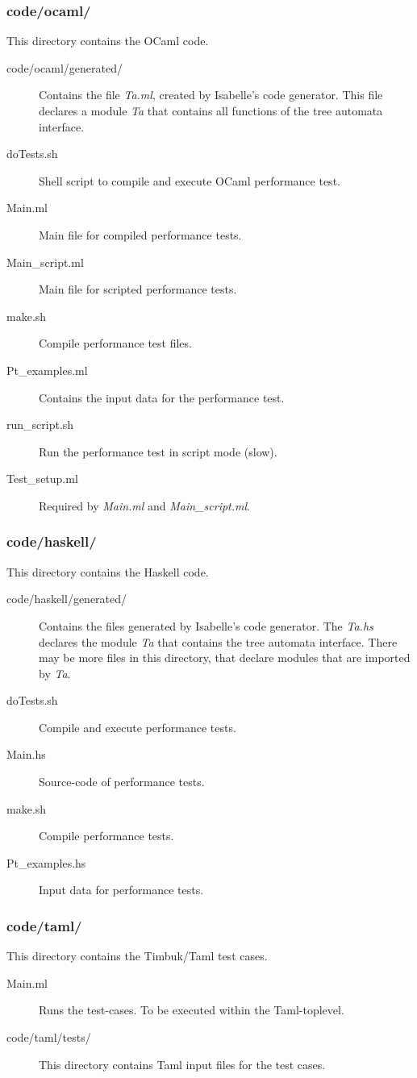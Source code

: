\subsubsection{code/ocaml/}
  This directory contains the OCaml code.
  \begin{description}
    \item[code/ocaml/generated/] Contains the file {\em Ta.ml}, created by Isabelle's code generator. This file declares
                              a module {\em Ta} that contains all functions of the tree automata interface.
    \item[doTests.sh] Shell script to compile and execute OCaml performance test.
    \item[Main.ml] Main file for compiled performance tests.
    \item[Main\_script.ml] Main file for scripted performance tests.
    \item[make.sh] Compile performance test files.
    \item[Pt\_examples.ml] Contains the input data for the performance test.
    \item[run\_script.sh] Run the performance test in script mode (slow).
    \item[Test\_setup.ml] Required by {\em Main.ml} and {\em Main\_script.ml}.
  \end{description}

\subsubsection{code/haskell/}
  This directory contains the Haskell code.

  \begin{description}
    \item[code/haskell/generated/] Contains the files generated by Isabelle's code generator.
      The {\em Ta.hs} declares the module {\em Ta} that contains the tree automata interface. There may be more files in this directory, that declare modules that are imported by {\em Ta}.
    \item[doTests.sh] Compile and execute performance tests.
    \item[Main.hs] Source-code of performance tests.
    \item[make.sh] Compile performance tests.
    \item[Pt\_examples.hs] Input data for performance tests.
  \end{description}

\subsubsection{code/taml/}
  This directory contains the Timbuk/Taml test cases.

  \begin{description}
    \item[Main.ml] Runs the test-cases. To be executed within the Taml-toplevel.
    \item[code/taml/tests/] This directory contains Taml input files for the test cases.
  \end{description}
